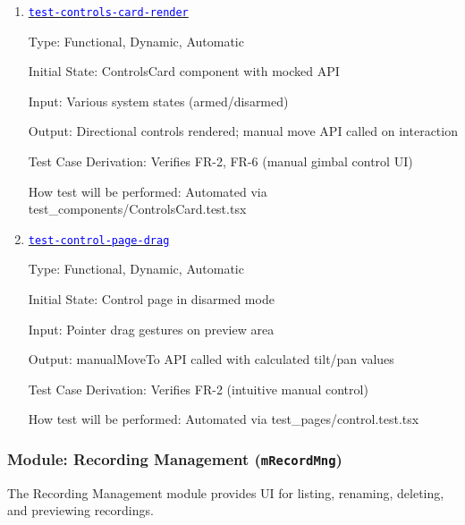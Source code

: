 \documentclass[12pt, titlepage]{article}
\newcommand{\mref}[1]{\texttt{#1}}
\newcommand{\tid}[1]{\hyperlink{tid:#1}{\textcolor{blue}{\texttt{#1}}}}
\begin{document}
\begin{enumerate}

  \item{\tid{test-controls-card-render}\\}

        Type: Functional, Dynamic, Automatic

        Initial State: ControlsCard component with mocked API

        Input: Various system states (armed/disarmed)

        Output: Directional controls rendered; manual move API called on interaction

        Test Case Derivation: Verifies FR-2, FR-6 (manual gimbal control UI)

        How test will be performed: Automated via
        test\_components/ControlsCard.test.tsx

  \item{\tid{test-control-page-drag}\\}

        Type: Functional, Dynamic, Automatic

        Initial State: Control page in disarmed mode

        Input: Pointer drag gestures on preview area

        Output: manualMoveTo API called with calculated tilt/pan values

        Test Case Derivation: Verifies FR-2 (intuitive manual control)

        How test will be performed: Automated via test\_pages/control.test.tsx

\end{enumerate}

\subsubsection{Module: Recording Management (\mref{mRecordMng})}

The Recording Management module provides UI for listing, renaming, deleting,
and previewing recordings.
\end{document}
